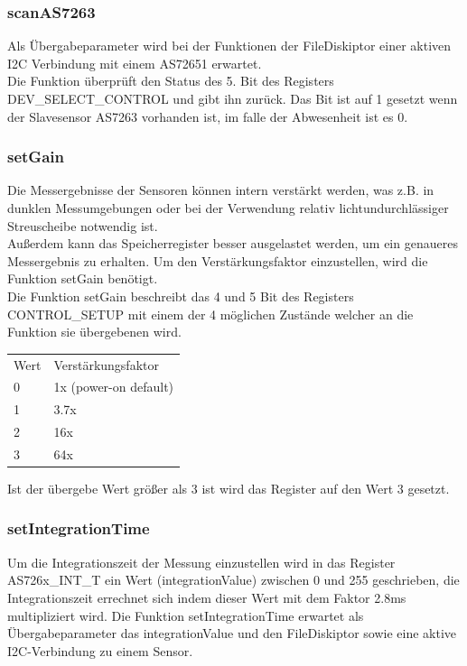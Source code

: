 \subsubsection{scanAS7263}
Als Übergabeparameter wird bei der Funktionen der FileDiskiptor einer aktiven I2C Verbindung mit einem AS72651 erwartet.\\
Die Funktion überprüft den Status des 5. Bit des Registers DEV\_SELECT\_CONTROL und gibt ihn zurück. Das Bit ist auf 1 gesetzt wenn der Slavesensor AS7263 vorhanden ist, im falle der Abwesenheit ist es 0.\\

\subsubsection{setGain}
Die Messergebnisse der Sensoren können intern verstärkt werden, was z.B. in dunklen Messumgebungen oder bei der Verwendung relativ lichtundurchlässiger Streuscheibe notwendig ist.\\
Außerdem kann das Speicherregister besser ausgelastet werden, um ein genaueres Messergebnis zu erhalten.
Um den Verstärkungsfaktor einzustellen, wird die Funktion setGain benötigt.\\
Die Funktion setGain beschreibt das 4 und 5 Bit des Registers CONTROL\_SETUP mit einem der 4 möglichen Zustände welcher an die Funktion sie übergebenen wird.

\begin{tabular}{ l l}
 	Wert & Verstärkungsfaktor \\ 
 	0 & 1x (power-on default) \\  
 	1 & 3.7x \\
 	2 & 16x \\  
 	3 & 64x \\
\end{tabular}

Ist der übergebe Wert größer als 3 ist wird das Register auf den Wert 3 gesetzt.

\subsubsection{setIntegrationTime}
Um die Integrationszeit der Messung einzustellen wird in das Register AS726x\_INT\_T ein Wert (integrationValue) zwischen 0 und 255 geschrieben, die Integrationszeit errechnet sich indem dieser Wert mit dem Faktor 2.8ms multipliziert wird.
Die Funktion setIntegrationTime erwartet als Übergabeparameter das integrationValue und den FileDiskiptor sowie eine aktive I2C-Verbindung zu einem Sensor.\\

